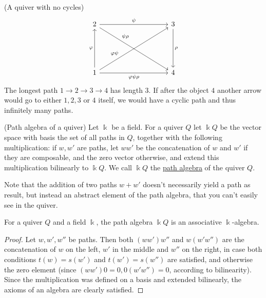 \begin{example}{(A quiver with no cycles)}\\
\[
\begin{tikzcd}
2 \arrow[rrrr, "\psi"] \arrow[rrrrddd, "\psi\rho", pos=0.3] &  &  &  &
3 \arrow[ddd, "\rho"] \\
 &  &  &  & \\
 &  &  &  & \\
1 \arrow[uuu, "\varphi"] \arrow[rrrruuu, "\varphi\psi", pos=0.3] \arrow[rrrr, "\varphi\psi\rho" '] &  &  &  & 4
\end{tikzcd}
\]
The longest path $1\rightarrow2\rightarrow3\rightarrow4$ has length 3. If after the object $4$ another arrow would go to either $1,2,3$ or $4$ itself,
we would have a cyclic path and thus infinitely many paths.
\end{example}

\begin{definition}{(Path algebra of a quiver)}\label{def:path_algebra}
Let $\Bbbk$ be a field. For a quiver $Q$ let $\Bbbk Q$ be the vector space with basis the set of all paths in $Q$, together with the
following multiplication: if $w, w'$ are paths, let $ww'$ be the concatenation of $w$ and $w'$ if they are composable, and the zero vector
otherwise, and extend this multiplication bilinearly to $\Bbbk Q$. We call $\Bbbk Q$ the \ul{path algebra} of the quiver $Q$.
\end{definition}

Note that the addition of two paths $w + w'$ doesn't necessarily yield a path as result, but instead an abstract element of the
path algebra, that you can't easily see in the quiver.

\begin{lemma}\label{la:path_algebra_is_ass_algebra}
For a quiver $Q$ and a field $\Bbbk$, the path algebra $\Bbbk Q$ is an associative $\Bbbk$-algebra.
\end{lemma}
\begin{proof}
Let $w, w', w''$ be paths. Then both $(ww')w''$ and $w(w'w'')$ are the concatenation of $w$ on the left,
$w'$ in the middle and $w''$ on the right, in case both conditions $t(w) = s(w')$ and $t(w') = s(w'')$ are satisfied, and
otherwise the zero element (since $(ww')0 = 0, 0(w'w'') = 0$, according to bilinearity).\\
Since the multiplication was defined on a basis and extended bilinearly, the axioms of an algebra are clearly satisfied.
\end{proof}


